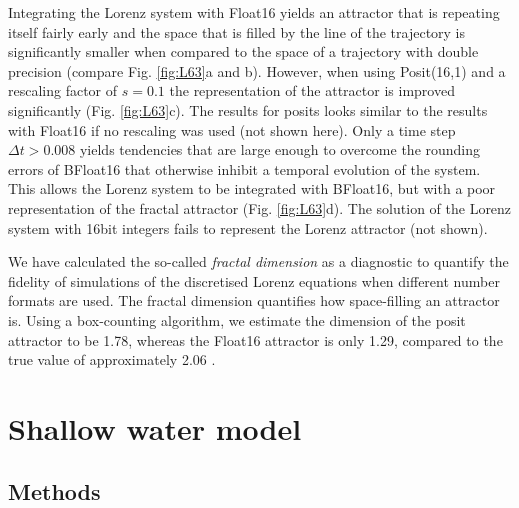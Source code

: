 \documentclass[draft]{agujournal2019}
\begin{document}
Integrating the Lorenz system with Float16 yields an attractor that is repeating itself fairly early and the space that is filled by the line of the trajectory is significantly smaller when compared to the space of a trajectory with double precision (compare Fig. \ref{fig:L63}a and b). However, when using Posit(16,1) and a rescaling factor of $s=0.1$ the representation of the attractor is improved significantly (Fig. \ref{fig:L63}c). The results for posits looks similar to the results with Float16 if no rescaling was used (not shown here). Only a time step $\Delta t > 0.008$ yields tendencies that are large enough to overcome the rounding errors of BFloat16 that otherwise inhibit a temporal evolution of the system. This  allows the Lorenz system to be integrated with BFloat16, but with a poor representation of the fractal attractor (Fig. \ref{fig:L63}d). The solution of the Lorenz system with 16bit integers fails to represent the Lorenz attractor (not shown).

We have calculated the so-called \emph{fractal dimension} as a diagnostic to quantify the fidelity of simulations of the discretised Lorenz equations when different number formats are used. The fractal dimension quantifies how space-filling an attractor is. Using a box-counting algorithm, we estimate the dimension of the posit attractor to be 1.78, whereas the Float16 attractor is only 1.29, compared to the true value of approximately 2.06 \cite{Grassberger1983,McGuinness1983}. 


\section{Shallow water model}
\label{sec:swm}

\subsection{Methods}
\label{sec:swm_methods}
\end{document}
